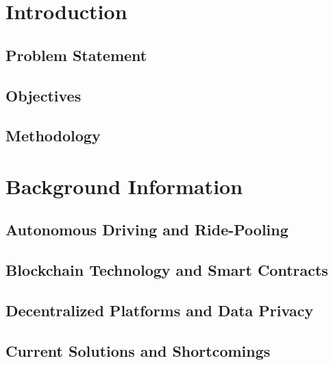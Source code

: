 \documentclass[
  a4paper,  %
  twoside,  %
  bibliography=totoc,
  headsepline,
  cleardoublepage=empty,
  parskip=half,
  draft=false
]{scrbook}
\begin{document}
%
%


\chapter{Introduction}

\section{Problem Statement}

\section{Objectives}\label{sec:objectives}

\section{Methodology}


\chapter{Background Information}

\section{Autonomous Driving and Ride-Pooling}

\section{Blockchain Technology and Smart Contracts}

\section{Decentralized Platforms and Data Privacy}

\section{Current Solutions and Shortcomings}

\end{document}
